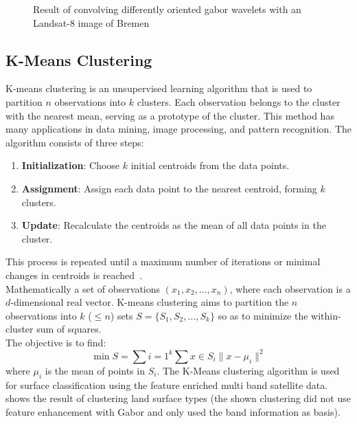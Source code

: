 \documentclass[12pt,a4paper, english,twoside]{article}
\begin{document}
\begin{figure}[!htbp]
\begin{subfigure}[b]{0.45\textwidth}
         \label{fig:feat06}
     \end{subfigure}
        \caption{Result of convolving differently oriented gabor wavelets with an Landsat-8 image of Bremen}\label{fig:gaborExample}
    \end{figure}

%
\newpage
  \subsection{K-Means Clustering}\label{sec:kmeans}
    K-means clustering is an unsupervised learning algorithm that is used to partition $n$ observations into $k$ clusters. 
    Each observation belongs to the cluster with the nearest mean, serving as a prototype of the cluster. 
    This method has many applications in data mining, image processing, and pattern recognition.
    The algorithm consists of three steps:
    \begin{enumerate}
        \item \textbf{Initialization}: Choose $k$ initial centroids from the data points.
        \item \textbf{Assignment}: Assign each data point to the nearest centroid, forming $k$ clusters.
        \item \textbf{Update}: Recalculate the centroids as the mean of all data points in the cluster. 
    \end{enumerate}
    This process is repeated until a maximum number of iterations or minimal changes in centroids is reached~\autocite{Sinaga2020}.\\ %
    Mathematically a set of observations $(x_1, x_2, \ldots, x_n)$, where each observation is a $d$-dimensional real vector.
    K-means clustering aims to partition the $n$ observations into $k$ ($\leq n$) sets $S = \{S_1, S_2, \ldots, S_k\}$ so as to minimize the within-cluster sum of squares. \\
    The objective is to find:
    \begin{equation}
        \min{S} = \sum{i=1}^{k} \sum{x \in S_i} \| x - \mu_i \|^2
    \end{equation}
    where $\mu_i$ is the mean of points in $S_i$.
    The K-Means clustering algorithm is used for surface classification using the feature enriched multi band satellite data.
     shows the result of clustering land surface types (the shown clustering did not use feature enhancement with Gabor and only used the band information as basis).%
\end{document}
